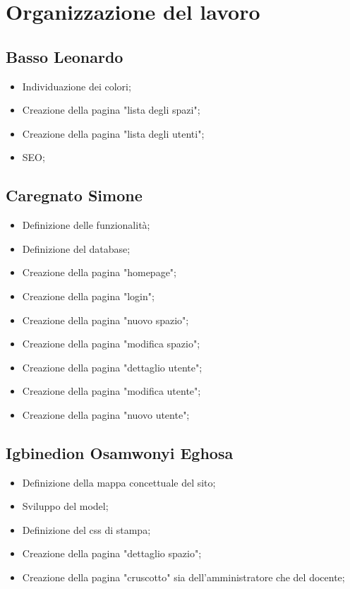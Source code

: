 \section{Organizzazione del lavoro}

\subsection{Basso Leonardo}
\begin{itemize}
	\item Individuazione dei colori;
	\item Creazione della pagina "lista degli spazi";
	\item Creazione della pagina "lista degli utenti";
	\item SEO;
\end{itemize}

\subsection{Caregnato Simone}
\begin{itemize}
	\item Definizione delle funzionalità;
	\item Definizione del database;
	\item Creazione della pagina "homepage";
	\item Creazione della pagina "login";
	\item Creazione della pagina "nuovo spazio";
	\item Creazione della pagina "modifica spazio";
	\item Creazione della pagina "dettaglio utente";
	\item Creazione della pagina "modifica utente";
	\item Creazione della pagina "nuovo utente";
\end{itemize}

\subsection{Igbinedion Osamwonyi Eghosa}
\begin{itemize}
	\item Definizione della mappa concettuale del sito;
	\item Sviluppo del model;
	\item Definizione del css di stampa;
	\item Creazione della pagina "dettaglio spazio";
	\item Creazione della pagina "cruscotto" sia dell'amministratore che
	      del docente;
\end{itemize}

